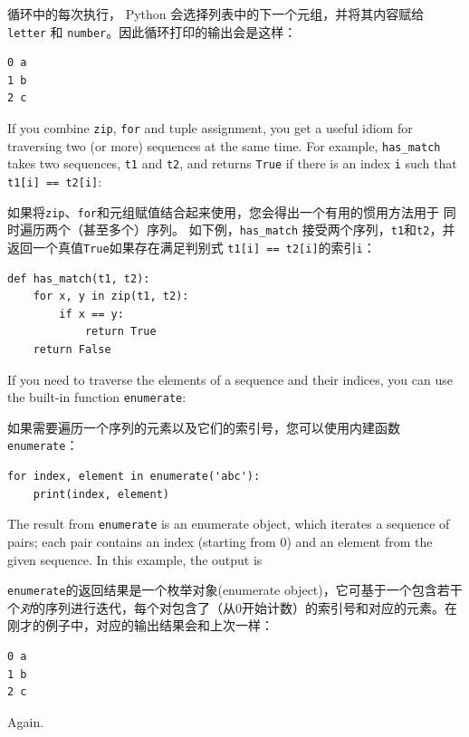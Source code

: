 循环中的每次执行， Python 会选择列表中的下一个元组，并将其内容赋给 \lstinline{letter} 和 \lstinline{number}。因此循环打印的输出会是这样：

\begin{lstlisting}
0 a
1 b
2 c
\end{lstlisting}

%
If you combine {\tt zip}, {\tt for} and tuple assignment, you get a
useful idiom for traversing two (or more) sequences at the same
time.  For example, \verb"has_match" takes two sequences, {\tt t1} and
{\tt t2}, and returns {\tt True} if there is an index {\tt i}
such that {\tt t1[i] == t2[i]}:

如果将\lstinline{zip}、\lstinline{for}和元组赋值结合起来使用，您会得出一个有用的惯用方法用于
同时遍历两个（甚至多个）序列。 如下例，\lstinline{has_match} 接受两个序列，\lstinline{t1}和\lstinline{t2}，并返回一个真值\lstinline{True}如果存在满足判别式 \lstinline{t1[i] == t2[i]}的索引\lstinline {i}：

\begin{lstlisting}
def has_match(t1, t2):
    for x, y in zip(t1, t2):
        if x == y:
            return True
    return False
\end{lstlisting}

%
If you need to traverse the elements of a sequence and their
indices, you can use the built-in function {\tt enumerate}:

如果需要遍历一个序列的元素以及它们的索引号，您可以使用内建函数\lstinline{enumerate}：
  

\begin{lstlisting}
for index, element in enumerate('abc'):
    print(index, element)
\end{lstlisting}

%
The result from {\tt enumerate} is an enumerate object, which
iterates a sequence of pairs; each pair contains an index (starting
from 0) and an element from the given sequence.
In this example, the output is

\lstinline{enumerate}的返回结果是一个枚举对象(enumerate object)，它可基于一个包含若干个\emph{对}的序列进行迭代，每个对包含了（从0开始计数）的索引号和对应的元素。在刚才的例子中，对应的输出结果会和上次一样：

\begin{lstlisting}
0 a
1 b
2 c
\end{lstlisting}

%
Again.
        


